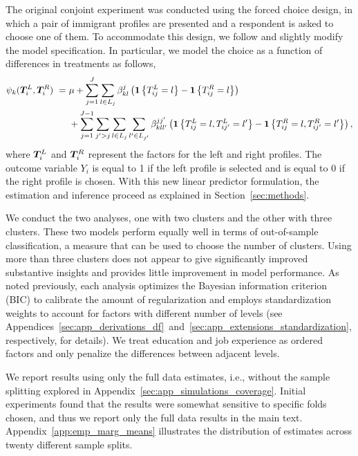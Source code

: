 The original conjoint experiment was conducted using the forced choice
design, in which a pair of immigrant profiles are presented and a
respondent is asked to choose one of them. To accommodate this design,
we follow \cite{egam:imai:19} and slightly modify the model
specification.  In particular, we model the choice as a function of
differences in treatments as follows,
\begin{align*}
\psi_k(\bm{T}_i^L, \bm{T}_i^R) \ = \ &  \mu + \sum_{j=1}^J \sum_{l \in L_j} \beta^j_{kl}\left(\mathbf{1}\left\{T^L_{ij}=l\right\}-\mathbf{1}\left\{T^R_{ij}=l\right\}\right)\\
& + \sum_{j=1}^{J-1} \sum_{j' > j} \sum_{l \in L_j} \sum_{l' \in L_{j'}} \beta^{jj'}_{kll'}\left(\mathbf{1}\left\{T^L_{ij}=l, T^L_{ij'}=l'\right\}-\mathbf{1}\left\{T^R_{ij}=l, T^R_{ij'}=l'\right\}\right),
\end{align*}
where $\bm{T}_i^L$ and $\bm{T}_i^R$ represent the factors for the left and
right profiles.  The outcome variable $Y_i$ is equal to 1 if the left
profile is selected and is equal to 0 if the right profile is chosen.
With this new linear predictor formulation, the estimation and
inference proceed as explained in Section~\ref{sec:methods}.

We conduct the two analyses, one with two clusters and the other with
three clusters.  These two models perform equally well in terms of
out-of-sample classification, a measure that can be used to choose the
number of clusters.  Using more than three clusters does not appear to
give significantly improved substantive insights and provides little
improvement in model performance.  As noted previously, each analysis
optimizes the Bayesian information criterion (BIC) to calibrate the
amount of regularization and employs standardization weights to
account for factors with different number of levels (see
Appendices~\ref{sec:app_derivations_df}~and~\ref{sec:app_extensions_standardization},
respectively, for details). We treat education and job experience as
ordered factors and only penalize the differences between adjacent
levels.

We report results using only the full data estimates, i.e., without
the sample splitting explored in
Appendix~\ref{sec:app_simulations_coverage}. Initial experiments found
that the results were somewhat sensitive to specific folds chosen, and
thus we report only the full data results in the main
text. Appendix~\ref{app:emp_marg_means} illustrates the distribution
of estimates across twenty different sample splits.

